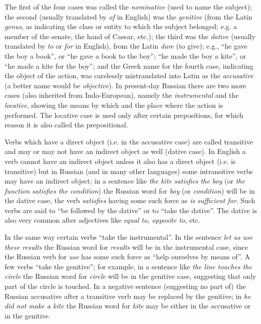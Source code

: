 The first of the four cases was called the \emph{nominative} (used to name the subject); the second (usually translated by \emph{of} in English) was the \emph{genitive} (from the Latin \emph{genus}, as indicating the class or entity to which the subject belonged; e.g. a member of the senate, the hand of Caesar, etc.); the third was the \emph{dative} (usually translated by \emph{to} or \emph{for} in English), from the Latin \emph{dare} (to give); e.g., ``he gave the boy a book'', or ``he gave a book to the boy''; ``he made the boy a kite'', or ``he made a kite for the boy''; and the Greek name for the fourth case, indicating the object of the action, was carelessly mistranslated into Latin as the \emph{accusative} (a better name would be \emph{objective}). In present-day Russian there are two more cases (also inherited from Indo-European), namely the \emph{instrumental} and the \emph{locative}, showing the means by which and the place where the action is performed. The locative case is used only after certain prepositions, for which reason it is also called the prepositional.

Verbs which have a direct object (i.e. in the accusative case) are called transitive and may or may not have an indirect object as well (dative case). In English a verb cannot have an indirect object unless it also has a direct object (i.e. is transitive) but in Russian (and in many other languages) some intransitive verbs may have an indirect object; in a sentence like \emph{the kite satisfies the boy} (or \emph{the function satisfies the condition}) the Russian word for \emph{boy} (or \emph{condition}) will be in the dative case, the verb \emph{satisfies} having some such force as \emph{is sufficient for}. Such verbs are said to ``be followed by the dative'' or to ``take the dative''. The dative is also very common after adjectives like \emph{equal to, opposite to}, etc.

In the same way certain verbs ``take the instrumental''. In the sentence \emph{let us use these results} the Russian word for \emph{results} will be in the instrumental case, since the Russian verb for \emph{use} has some such force as ``help ourselves by means of''. A few verbs ``take the genitive''; for example, in a sentence like \emph{the line touches the circle} the Russian word for \emph{circle} will be in the genitive case, suggesting that only part of the circle is touched. In a negative sentence (suggesting no part of) the Russian accusative after a transitive verb may be replaced by the genitive; in \emph{he did not make a kite} the Russian word for \emph{kite} may be either in the accusative or in the genitive.

